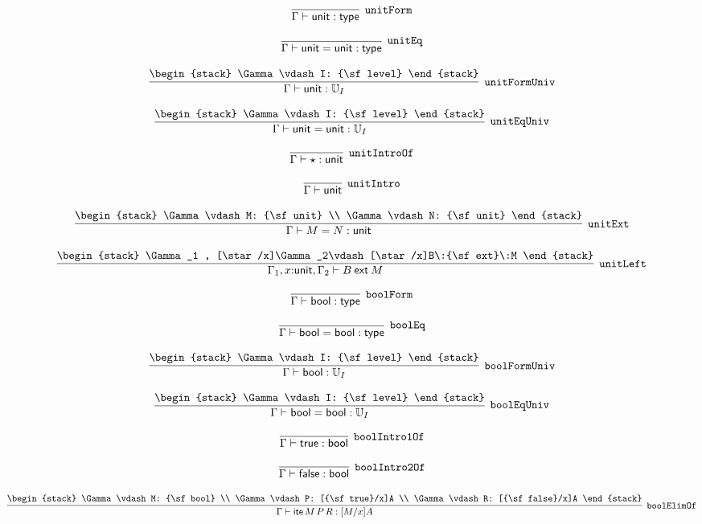 \[
\infer[{\tt unitForm}]{\Gamma \vdash {\sf unit}: {\sf type}}{}
\]

\[
\infer[{\tt unitEq}]{\Gamma \vdash {\sf unit}= {\sf unit}: {\sf type}}{}
\]

\[
\infer[{\tt unitFormUniv}]{\Gamma \vdash {\sf unit}: {\Bbb U}_{I}}{
\begin{stack}
\Gamma \vdash I: {\sf level}
\end{stack}}
\]

\[
\infer[{\tt unitEqUniv}]{\Gamma \vdash {\sf unit}= {\sf unit}: {\Bbb U}_{I}}{
\begin{stack}
\Gamma \vdash I: {\sf level}
\end{stack}}
\]

\[
\infer[{\tt unitIntroOf}]{\Gamma \vdash \star : {\sf unit}}{}
\]

\[
\infer[{\tt unitIntro}]{\Gamma \vdash {\sf unit}}{}
\]

\[
\infer[{\tt unitExt}]{\Gamma \vdash M= N: {\sf unit}}{
\begin{stack}
\Gamma \vdash M: {\sf unit}
\\
\Gamma \vdash N: {\sf unit}
\end{stack}}
\]

\[
\infer[{\tt unitLeft}]{\Gamma_1 ,x\mathord{:}{\sf unit}, \Gamma_2 \vdash B\:{\sf ext}\:M}{
\begin{stack}
\Gamma_1 , [\star /x]\Gamma_2\vdash [\star /x]B\:{\sf ext}\:M
\end{stack}}
\]

\[
\infer[{\tt boolForm}]{\Gamma \vdash {\sf bool}: {\sf type}}{}
\]

\[
\infer[{\tt boolEq}]{\Gamma \vdash {\sf bool}= {\sf bool}: {\sf type}}{}
\]

\[
\infer[{\tt boolFormUniv}]{\Gamma \vdash {\sf bool}: {\Bbb U}_{I}}{
\begin{stack}
\Gamma \vdash I: {\sf level}
\end{stack}}
\]

\[
\infer[{\tt boolEqUniv}]{\Gamma \vdash {\sf bool}= {\sf bool}: {\Bbb U}_{I}}{
\begin{stack}
\Gamma \vdash I: {\sf level}
\end{stack}}
\]

\[
\infer[{\tt boolIntro1Of}]{\Gamma \vdash {\sf true}: {\sf bool}}{}
\]

\[
\infer[{\tt boolIntro2Of}]{\Gamma \vdash {\sf false}: {\sf bool}}{}
\]

\[
\infer[{\tt boolElimOf}]{\Gamma \vdash {\sf ite}\,M\,P\,R: [M/x]A}{
\begin{stack}
\Gamma \vdash M: {\sf bool}
\\
\Gamma \vdash P: [{\sf true}/x]A
\\
\Gamma \vdash R: [{\sf false}/x]A
\end{stack}}
\]

